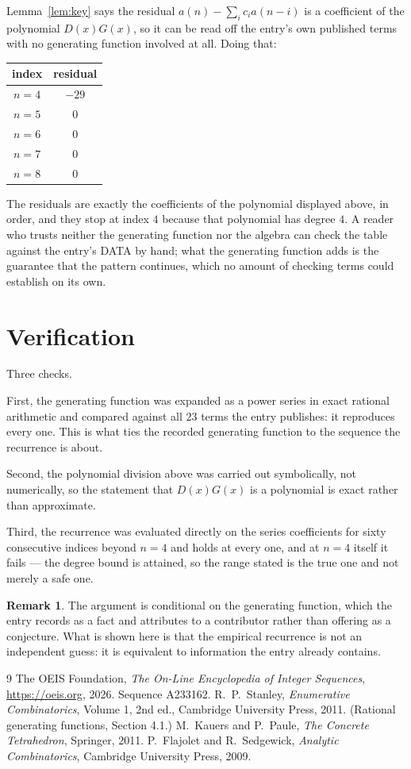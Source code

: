 \documentclass[11pt,a4paper]{article}
\theoremstyle{plain}
\theoremstyle{definition}
\newtheorem{remark}[theorem]{Remark}
\begin{document}
Lemma~\ref{lem:key} says the residual $a(n)-\sum_ic_ia(n-i)$ is a coefficient of the
polynomial $D(x)G(x)$, so it can be read off the entry's own published terms with no
generating function involved at all. Doing that:
\begin{center}
\begin{tabular}{cc}
index & residual \\ \hline
$n=4$ & $-29$ \\
$n=5$ & $0$ \\
$n=6$ & $0$ \\
$n=7$ & $0$ \\
$n=8$ & $0$
\end{tabular}
\end{center}
The residuals are exactly the coefficients of the polynomial displayed above, in order, and
they stop at index $4$ because that polynomial has degree $4$. A reader who trusts
neither the generating function nor the algebra can check the table against the entry's DATA
by hand; what the generating function adds is the guarantee that the pattern continues, which
no amount of checking terms could establish on its own.

\section{Verification}

Three checks.

First, the generating function was expanded as a power series in exact rational arithmetic and
compared against all $23$ terms the entry publishes: it reproduces every one. This is
what ties the recorded generating function to the sequence the recurrence is about.

Second, the polynomial division above was carried out symbolically, not numerically, so the
statement that $D(x)G(x)$ is a polynomial is exact rather than approximate.

Third, the recurrence was evaluated directly on the series coefficients for sixty consecutive
indices beyond $n=4$ and holds at every one, and at $n=4$ itself it fails --- the
degree bound is attained, so the range stated is the true one and not merely a safe one.

\begin{remark}
The argument is conditional on the generating function, which the entry records as a fact and
attributes to a contributor rather than offering as a conjecture. What is shown here is that
the empirical recurrence is not an independent guess: it is equivalent to information the
entry already contains.
\end{remark}

\begin{thebibliography}{9}
 The OEIS Foundation, \emph{The On-Line Encyclopedia of Integer
Sequences}, \url{https://oeis.org}, 2026. Sequence A233162.
 R.~P.~Stanley, \emph{Enumerative Combinatorics}, Volume 1, 2nd ed.,
Cambridge University Press, 2011. (Rational generating functions, Section 4.1.)
 M.~Kauers and P.~Paule, \emph{The Concrete Tetrahedron}, Springer, 2011.
 P.~Flajolet and R.~Sedgewick, \emph{Analytic Combinatorics}, Cambridge
University Press, 2009.
\end{thebibliography}
\end{document}
